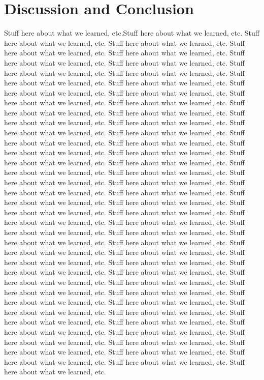\documentclass[conference, 10pt]{IEEEtran}
\begin{document}
\section{Discussion and Conclusion}
Stuff here about what we learned, etc.Stuff here about what we learned, etc.
Stuff here about what we learned, etc.
Stuff here about what we learned, etc.
Stuff here about what we learned, etc.
Stuff here about what we learned, etc.
Stuff here about what we learned, etc.
Stuff here about what we learned, etc.
Stuff here about what we learned, etc.
Stuff here about what we learned, etc.
Stuff here about what we learned, etc.
Stuff here about what we learned, etc.
Stuff here about what we learned, etc.
Stuff here about what we learned, etc.
Stuff here about what we learned, etc.
Stuff here about what we learned, etc.
Stuff here about what we learned, etc.
Stuff here about what we learned, etc.
Stuff here about what we learned, etc.
Stuff here about what we learned, etc.
Stuff here about what we learned, etc.
Stuff here about what we learned, etc.
Stuff here about what we learned, etc.
Stuff here about what we learned, etc.
Stuff here about what we learned, etc.
Stuff here about what we learned, etc.
Stuff here about what we learned, etc.
Stuff here about what we learned, etc.
Stuff here about what we learned, etc.
Stuff here about what we learned, etc.
Stuff here about what we learned, etc.
Stuff here about what we learned, etc.
Stuff here about what we learned, etc.
Stuff here about what we learned, etc.
Stuff here about what we learned, etc.
Stuff here about what we learned, etc.
Stuff here about what we learned, etc.
Stuff here about what we learned, etc.
Stuff here about what we learned, etc.
Stuff here about what we learned, etc.
Stuff here about what we learned, etc.
Stuff here about what we learned, etc.
Stuff here about what we learned, etc.
Stuff here about what we learned, etc.
Stuff here about what we learned, etc.
Stuff here about what we learned, etc.
Stuff here about what we learned, etc.
Stuff here about what we learned, etc.
Stuff here about what we learned, etc.
Stuff here about what we learned, etc.
Stuff here about what we learned, etc.
Stuff here about what we learned, etc.
Stuff here about what we learned, etc.
Stuff here about what we learned, etc.
Stuff here about what we learned, etc.
Stuff here about what we learned, etc.
Stuff here about what we learned, etc.
Stuff here about what we learned, etc.
Stuff here about what we learned, etc.
Stuff here about what we learned, etc.
Stuff here about what we learned, etc.
Stuff here about what we learned, etc.
Stuff here about what we learned, etc.
Stuff here about what we learned, etc.
Stuff here about what we learned, etc.
Stuff here about what we learned, etc.
Stuff here about what we learned, etc.
Stuff here about what we learned, etc.
Stuff here about what we learned, etc.
\end{document}
